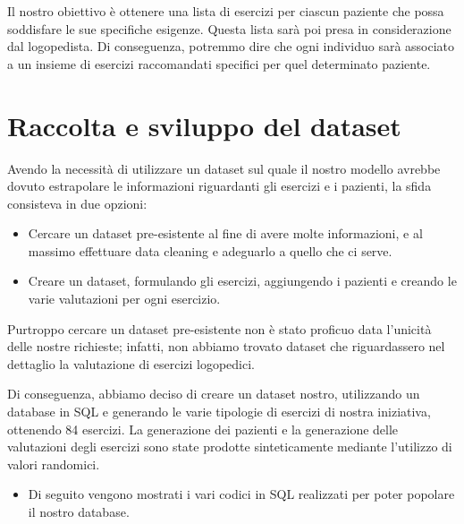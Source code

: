 \documentclass{article}
\begin{document}
    Il nostro obiettivo è ottenere una lista di esercizi per ciascun paziente che possa soddisfare le sue specifiche esigenze. Questa lista sarà poi presa in
    considerazione dal logopedista. Di conseguenza, potremmo dire che ogni individuo sarà associato a un insieme di esercizi raccomandati specifici per quel determinato
    paziente.

    \section{Raccolta e sviluppo del dataset}

    Avendo la necessità di utilizzare un dataset sul quale il nostro modello avrebbe dovuto estrapolare le informazioni riguardanti gli esercizi e i pazienti, la sfida consisteva in due opzioni:

    \begin{itemize}
        \item Cercare un dataset pre-esistente al fine di avere molte informazioni, e al massimo effettuare data cleaning e adeguarlo a quello che ci serve.
        \item Creare un dataset, formulando gli esercizi, aggiungendo i pazienti e creando le varie valutazioni per ogni esercizio.
    \end{itemize}

    Purtroppo cercare un dataset pre-esistente non è stato proficuo data l'unicità delle nostre richieste; infatti, non abbiamo trovato dataset che riguardassero nel dettaglio la valutazione di esercizi logopedici.

    Di conseguenza, abbiamo deciso di creare un dataset nostro, utilizzando un database in SQL e generando le varie tipologie di esercizi di nostra iniziativa, ottenendo 84 esercizi. La generazione dei pazienti e la generazione delle valutazioni degli esercizi sono state prodotte sinteticamente mediante l'utilizzo di valori randomici.

    \begin{itemize}
        \item Di seguito vengono mostrati i vari codici in SQL realizzati per poter popolare il nostro database.
    \end{itemize}
\end{document}
